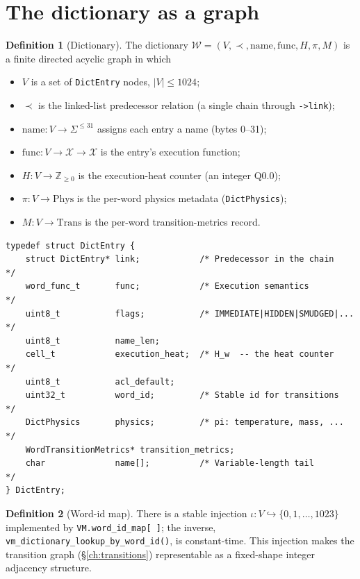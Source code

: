 \documentclass[11pt,letterpaper,openany]{book}
\theoremstyle{definition}
\newtheorem{definition}{Definition}[chapter]
\theoremstyle{plain}
\begin{document}
\section{The dictionary as a graph}

\begin{definition}[Dictionary]\label{def:dict}
The dictionary $\mathcal{W} = (V, \prec, \mathrm{name}, \mathrm{func}, H, \pi, M)$
is a finite directed acyclic graph in which
\begin{itemize}\setlength\itemsep{0pt}
  \item $V$ is a set of \texttt{DictEntry} nodes, $|V| \le 1024$;
  \item $\prec$ is the linked-list predecessor relation (a single chain through \texttt{->link});
  \item $\mathrm{name}: V\to\Sigma^{\le 31}$ assigns each entry a name (bytes 0--31);
  \item $\mathrm{func}: V\to\mathcal{X}\to\mathcal{X}$ is the entry's execution function;
  \item $H: V\to\mathbb{Z}_{\ge 0}$ is the execution-heat counter (an integer Q0.0);
  \item $\pi: V\to\mathrm{Phys}$ is the per-word physics metadata (\texttt{DictPhysics});
  \item $M: V\to\mathrm{Trans}$ is the per-word transition-metrics record.
\end{itemize}
\end{definition}

\begin{lstlisting}[caption={The \texttt{DictEntry} record
  (\texttt{include/vm.h}:339--351).},label={lst:dictentry}]
typedef struct DictEntry {
    struct DictEntry* link;            /* Predecessor in the chain     */
    word_func_t       func;            /* Execution semantics          */
    uint8_t           flags;           /* IMMEDIATE|HIDDEN|SMUDGED|... */
    uint8_t           name_len;
    cell_t            execution_heat;  /* H_w  -- the heat counter     */
    uint8_t           acl_default;
    uint32_t          word_id;         /* Stable id for transitions    */
    DictPhysics       physics;         /* pi: temperature, mass, ...   */
    WordTransitionMetrics* transition_metrics;
    char              name[];          /* Variable-length tail         */
} DictEntry;
\end{lstlisting}

\begin{definition}[Word-id map]
There is a stable injection $\iota: V \hookrightarrow \{0,1,\dots,1023\}$
implemented by \texttt{VM.word\_id\_map[\,]}; the inverse,
\texttt{vm\_dictionary\_lookup\_by\_word\_id()}, is constant-time.
This injection makes the transition graph (\S\ref{ch:transitions})
representable as a fixed-shape integer adjacency structure.
\end{definition}
\end{document}
